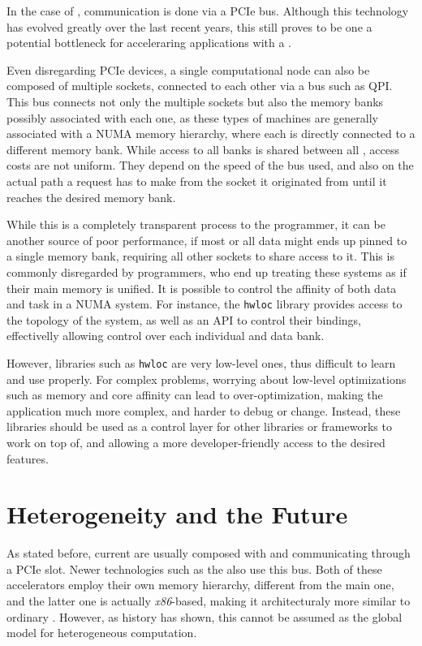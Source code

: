 \documentclass[main.tex]{subfiles}
\begin{document}
In the case of \gpus, communication is done via a \acs{PCIe} bus. Although this technology has evolved greatly over the last recent years, this still proves to be one a potential bottleneck for acceleraring applications with a \gpu.

Even disregarding \acs{PCIe} devices, a single computational node can also be composed of multiple \cpu sockets, connected to each other via a bus such as \ac{QPI}. This bus connects not only the multiple sockets but also the memory banks possibly associated with each one, as these types of machines are generally associated with a \acs{NUMA} memory hierarchy, where each \cpu is directly connected to a different memory bank. While access to all banks is shared between all \cpus, access costs are not uniform. They depend on the speed of the bus used, and also on the actual path a request has to make from the socket it originated from until it reaches the desired memory bank.

While this is a completely transparent process to the programmer, it can be another source of poor performance, if most or all data might ends up pinned to a single memory bank, requiring all other sockets to share access to it. This is commonly disregarded by programmers, who end up treating these systems as if their main memory is unified. It is possible to control the affinity of both data and task in a \acs{NUMA} system. For instance, the \texttt{hwloc}\cite{broquedis2010hwloc} library provides access to the topology of the system, as well as an API to control their bindings, effectivelly allowing control over each individual \cpu and data bank.

However, libraries such as \texttt{hwloc} are very low-level ones, thus difficult to learn and use properly. For complex problems, worrying about low-level optimizations such as memory and core affinity can lead to over-optimization, making the application much more complex, and harder to debug or change.
Instead, these libraries should be used as a control layer for other libraries or frameworks to work on top of, and allowing a more developer-friendly access to the desired features.

\section{Heterogeneity and the Future}

As stated before, current \hetplats are usually composed with \cpus and \gpus communicating through a \acs{PCIe} slot. Newer technologies such as the \intel \mic also use this bus. Both of these accelerators employ their own memory hierarchy, different from the main one, and the latter one is actually \textit{x86}-based, making it architecturaly more similar to ordinary \cpus. However, as history has shown, this cannot be assumed as the global model for heterogeneous computation.
\end{document}
